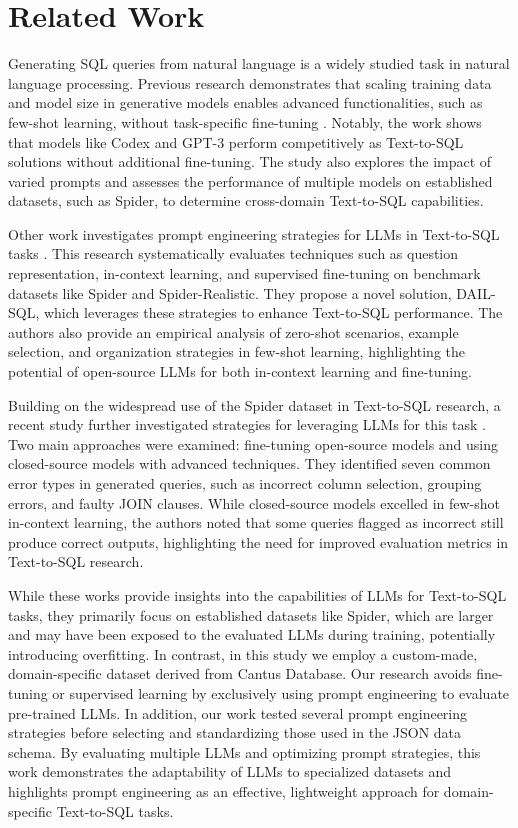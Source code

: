 \section{Related Work}

Generating SQL queries from natural language is a widely studied task in natural language processing. Previous research demonstrates that scaling training data and model size in generative models enables advanced functionalities, such as few-shot learning, without task-specific fine-tuning \cite{rajkumar2022texttosql}. Notably, the work shows that models like Codex and GPT-3 perform competitively as Text-to-SQL solutions without additional fine-tuning. The study also explores the impact of varied prompts and assesses the performance of multiple models on established datasets, such as Spider, to determine cross-domain Text-to-SQL capabilities.

Other work investigates prompt engineering strategies for LLMs in Text-to-SQL tasks \cite{gao2023text2sql}. This research systematically evaluates techniques such as question representation, in-context learning, and supervised fine-tuning on benchmark datasets like Spider and Spider-Realistic. They propose a novel solution, DAIL-SQL, which leverages these strategies to enhance Text-to-SQL performance. The authors also provide an empirical analysis of zero-shot scenarios, example selection, and organization strategies in few-shot learning, highlighting the potential of open-source LLMs for both in-context learning and fine-tuning.

Building on the widespread use of the Spider dataset in Text-to-SQL research, a recent study further investigated strategies for leveraging LLMs for this task \cite{roberson2024analyzing}. Two main approaches were examined: fine-tuning open-source models and using closed-source models with advanced techniques. They identified seven common error types in generated queries, such as incorrect column selection, grouping errors, and faulty JOIN clauses. While closed-source models excelled in few-shot in-context learning, the authors noted that some queries flagged as incorrect still produce correct outputs, highlighting the need for improved evaluation metrics in Text-to-SQL research.

While these works provide insights into the capabilities of LLMs for Text-to-SQL tasks, they primarily focus on established datasets like Spider, which are larger and may have been exposed to the evaluated LLMs during training, potentially introducing overfitting. In contrast, in this study we employ a custom-made, domain-specific dataset derived from Cantus Database. Our research avoids fine-tuning or supervised learning by exclusively using prompt engineering to evaluate pre-trained LLMs. In addition, our work tested several prompt engineering strategies before selecting and standardizing those used in the JSON data schema. By evaluating multiple LLMs and optimizing prompt strategies, this work demonstrates the adaptability of LLMs to specialized datasets and highlights prompt engineering as an effective, lightweight approach for domain-specific Text-to-SQL tasks.